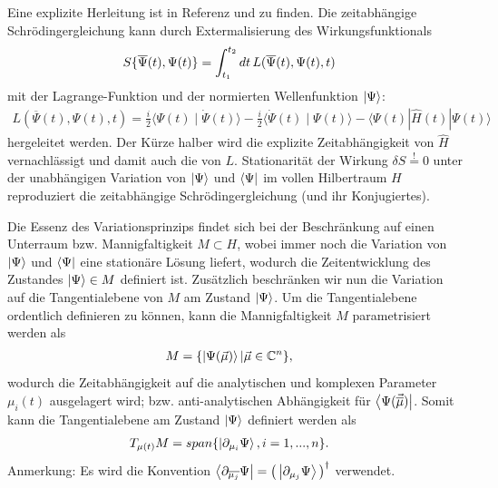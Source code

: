 Eine explizite Herleitung ist in Referenz \cite{noauthor_2008-dn} und \cite{Haegeman_2011} zu finden.
Die zeitabhängige Schrödingergleichung kann durch Extermalisierung des Wirkungsfunktionals
\begin{align}\label{Wirkungsfunktional}
    S\{\overline{\Psi}(t),\Psi(t)\} &=  \int_{t_1}^{t_2}dt \thinspace L(\overline{\Psi}(t),\Psi(t),t)
\end{align}
mit der Lagrange-Funktion und der normierten Wellenfunktion $\ket{\Psi}$:
\begin{align}\label{Lagrange}
    L\left(\overline{\Psi}(t), \Psi(t), t\right)=\frac{i}{2}\langle\Psi(t) \mid \dot{\Psi}(t)\rangle-\frac{i}{2}\langle\dot{\Psi}(t) \mid \Psi(t)\rangle-\langle\Psi(t)|\hat{H}(t)| \Psi(t)\rangle
\end{align}
hergeleitet werden. Der Kürze halber wird die explizite Zeitabhängigkeit von $\hat{H}$ vernachlässigt und damit auch die von $L$. Stationarität der Wirkung 
$\delta S \overset{!}{=} 0$ unter der unabhängigen Variation von $\ket{\Psi}$ und $\bra{\Psi}$ im vollen Hilbertraum $H$ reproduziert die zeitabhängige 
Schrödingergleichung (und ihr Konjugiertes).\

Die Essenz des Variationsprinzips findet sich bei der Beschränkung auf einen Unterraum bzw. Mannigfaltigkeit $M\subset H$, wobei 
immer noch die Variation von $\ket{\Psi}$ und $\bra{\Psi}$ eine stationäre Lösung liefert, wodurch die Zeitentwicklung des Zustandes $\ket{\Psi} \in M$
definiert ist. Zusätzlich beschränken wir nun die Variation auf die Tangentialebene von $M$ am Zustand $\ket{\Psi}$. Um die Tangentialebene ordentlich 
definieren zu können, kann die Mannigfaltigkeit $M$ parametrisiert werden als   
\begin{align}
    M &= \{\ket{\Psi(\vec{\mu})}|\vec{\mu}\in \mathbb{C}^n\},
\end{align}
wodurch die Zeitabhängigkeit auf die analytischen und komplexen Parameter $\mu_i(t)$ ausgelagert wird; bzw. anti-analytischen Abhängigkeit für 
$\bra{\Psi(\vec{\overline{\mu}})}$. Somit kann die Tangentialebene am Zustand $\ket{\Psi}$ definiert werden als  
\begin{align}
    T_{\mu(t)}M &= span\{\ket{\partial_{\mu_i}\Psi}, i = 1,...,n\}.
\end{align}
Anmerkung: Es wird die Konvention $\bra{\partial_{\overline{\mu_j}}\Psi} = \left(\thinspace\ket{\partial_{\mu_j}\Psi}\thinspace\right)^\dagger$ verwendet.

